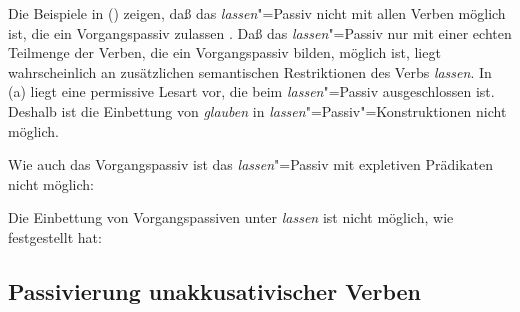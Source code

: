 Die Beispiele in () zeigen, daß das \emph{lassen}"=Passiv nicht mit allen Verben möglich ist,
die ein Vorgangspassiv zulassen \citep[]{Reis76c}.
Daß das \emph{lassen}"=Passiv nur mit einer echten Teilmenge der Verben, die ein Vorgangspassiv bilden,
möglich ist, liegt wahrscheinlich an zusätzlichen semantischen Restriktionen des Verbs \emph{lassen}.
\eal
{}
\zl
In (a) liegt eine permissive Lesart vor, die beim \emph{lassen}"=Passiv ausgeschlossen ist.
Deshalb ist die Einbettung von \emph{glauben} in \emph{lassen}"=Passiv"=Konstruktionen nicht möglich.
\eal
{}
\zl

\noindent
Wie auch das Vorgangspassiv ist das \emph{lassen}"=Passiv mit expletiven Prädikaten nicht möglich:
\z

\noindent
Die Einbettung von Vorgangspassiven unter \emph{lassen} ist nicht möglich,
wie \citet[]{Wilder90a} festgestellt hat:
\eal
{}
\zl
%


\subsection{Passivierung unakkusativischer Verben}
\label{sec-passive-unakkusativ}

